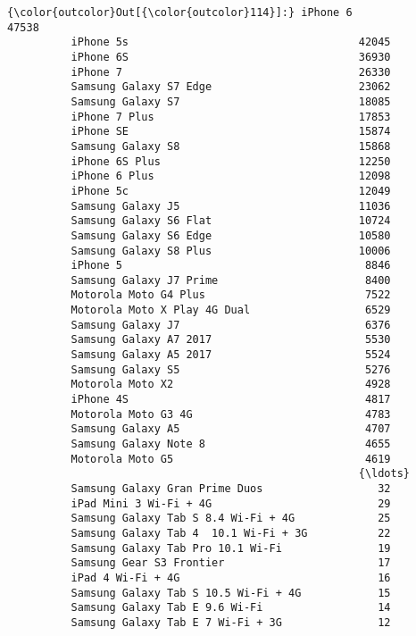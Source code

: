 \documentclass[11pt]{article}
\begin{document}
\begin{Verbatim}[commandchars=\\\{\}]
{\color{outcolor}Out[{\color{outcolor}114}]:} iPhone 6                                     47538
          iPhone 5s                                    42045
          iPhone 6S                                    36930
          iPhone 7                                     26330
          Samsung Galaxy S7 Edge                       23062
          Samsung Galaxy S7                            18085
          iPhone 7 Plus                                17853
          iPhone SE                                    15874
          Samsung Galaxy S8                            15868
          iPhone 6S Plus                               12250
          iPhone 6 Plus                                12098
          iPhone 5c                                    12049
          Samsung Galaxy J5                            11036
          Samsung Galaxy S6 Flat                       10724
          Samsung Galaxy S6 Edge                       10580
          Samsung Galaxy S8 Plus                       10006
          iPhone 5                                      8846
          Samsung Galaxy J7 Prime                       8400
          Motorola Moto G4 Plus                         7522
          Motorola Moto X Play 4G Dual                  6529
          Samsung Galaxy J7                             6376
          Samsung Galaxy A7 2017                        5530
          Samsung Galaxy A5 2017                        5524
          Samsung Galaxy S5                             5276
          Motorola Moto X2                              4928
          iPhone 4S                                     4817
          Motorola Moto G3 4G                           4783
          Samsung Galaxy A5                             4707
          Samsung Galaxy Note 8                         4655
          Motorola Moto G5                              4619
                                                       {\ldots}  
          Samsung Galaxy Gran Prime Duos                  32
          iPad Mini 3 Wi-Fi + 4G                          29
          Samsung Galaxy Tab S 8.4 Wi-Fi + 4G             25
          Samsung Galaxy Tab 4  10.1 Wi-Fi + 3G           22
          Samsung Galaxy Tab Pro 10.1 Wi-Fi               19
          Samsung Gear S3 Frontier                        17
          iPad 4 Wi-Fi + 4G                               16
          Samsung Galaxy Tab S 10.5 Wi-Fi + 4G            15
          Samsung Galaxy Tab E 9.6 Wi-Fi                  14
          Samsung Galaxy Tab E 7 Wi-Fi + 3G               12

\end{Verbatim}
\end{document}

